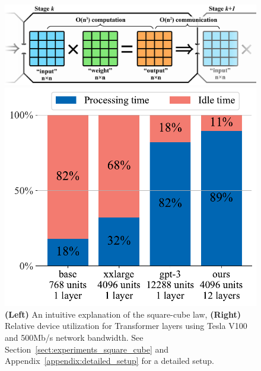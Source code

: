 \begin{figure}[t]
    \centering
    \begin{minipage}[][][b]{0.64\textwidth}
    \includegraphics[width=\linewidth]{resources/squarecube_short_v2_max.pdf}
    \caption{\textbf{(Left)} An intuitive explanation of the square-cube law, \textbf{(Right)} Relative device utilization for Transformer layers using Tesla V100 and 500Mb/s network bandwidth. See Section~\ref{sect:experiments_square_cube} and Appendix~\ref{appendix:detailed_setup} for a detailed setup.}
    \label{fig:squarecube}
    \end{minipage}
    \begin{minipage}[][][b]{0.35\textwidth}
    \includegraphics[width=\linewidth]{resources/perf_relative_notitle.pdf}
    \end{minipage}
    \vspace{-10pt}
\end{figure}